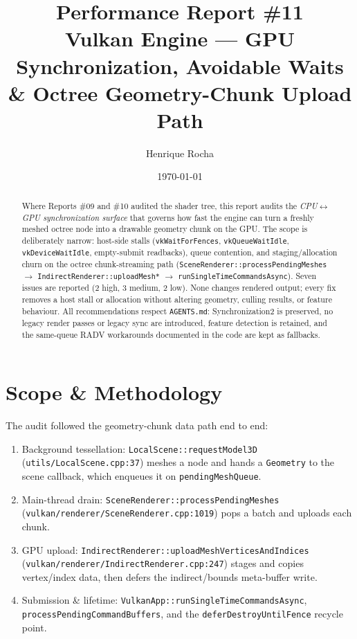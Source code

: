 \documentclass[a4paper,12pt]{article}
\title{\textbf{Performance Report \#11}\\[4pt]
\large Vulkan Engine — GPU Synchronization, Avoidable Waits \&
Octree Geometry-Chunk Upload Path}
\author{Henrique Rocha}
\date{\today}
\begin{document}
\maketitle

\begin{abstract}
Where Reports \#09 and \#10 audited the shader tree, this report audits the
\emph{CPU$\leftrightarrow$GPU synchronization surface} that governs how fast the
engine can turn a freshly meshed octree node into a drawable geometry chunk on
the GPU. The scope is deliberately narrow: host-side stalls
(\texttt{vkWaitForFences}, \texttt{vkQueueWaitIdle}, \texttt{vkDeviceWaitIdle},
empty-submit readbacks), queue contention, and staging/allocation churn on the
octree chunk-streaming path (\texttt{SceneRenderer::processPendingMeshes} $\rightarrow$
\texttt{IndirectRenderer::uploadMesh*} $\rightarrow$ \texttt{runSingleTimeCommandsAsync}).
Seven issues are reported (2 high, 3 medium, 2 low). None changes rendered
output; every fix removes a host stall or allocation without altering geometry,
culling results, or feature behaviour. All recommendations respect
\texttt{AGENTS.md}: Synchronization2 is preserved, no legacy render passes or
legacy sync are introduced, feature detection is retained, and the same-queue
RADV workarounds documented in the code are kept as fallbacks.
\end{abstract}

\tableofcontents
\newpage

\section{Scope \& Methodology}

The audit followed the geometry-chunk data path end to end:

\begin{enumerate}[leftmargin=*]
  \item Background tessellation: \texttt{LocalScene::requestModel3D}
        (\texttt{utils/LocalScene.cpp:37}) meshes a node and hands a
        \texttt{Geometry} to the scene callback, which enqueues it on
        \texttt{pendingMeshQueue}.
  \item Main-thread drain: \texttt{SceneRenderer::processPendingMeshes}
        (\texttt{vulkan/renderer/SceneRenderer.cpp:1019}) pops a batch and
        uploads each chunk.
  \item GPU upload: \texttt{IndirectRenderer::uploadMeshVerticesAndIndices}
        (\texttt{vulkan/renderer/IndirectRenderer.cpp:247}) stages and copies
        vertex/index data, then defers the indirect/bounds meta-buffer write.
  \item Submission \& lifetime: \texttt{VulkanApp::runSingleTimeCommandsAsync},
        \texttt{processPendingCommandBuffers}, and the
        \texttt{deferDestroyUntilFence} recycle point.
\end{enumerate}
\end{document}
